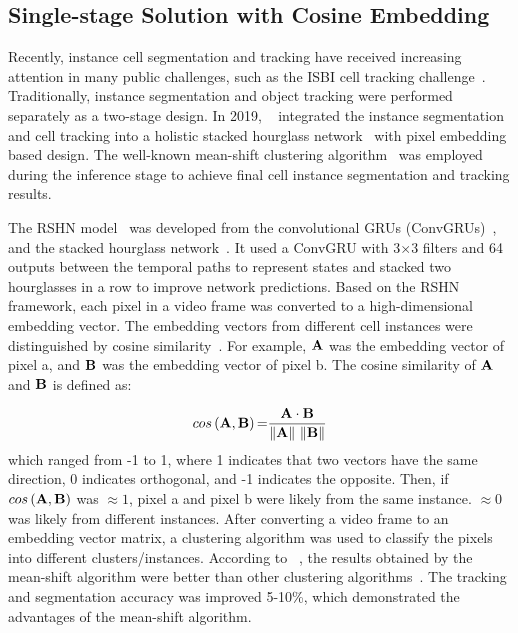 \documentclass[journal,twoside,web]{ieeecolor}
\begin{document}
\subsection{Single-stage Solution with Cosine Embedding}
Recently, instance cell segmentation and tracking have received increasing attention in many public challenges, such as the ISBI cell tracking challenge~\cite{b20}. Traditionally, instance segmentation and object tracking were performed separately as a two-stage design. In 2019, ~\cite{b15} integrated the instance segmentation and cell tracking into a holistic stacked hourglass network~\cite{b27} with pixel embedding based design. The well-known mean-shift clustering algorithm~\cite{b21} was employed during the inference stage to achieve final cell instance segmentation and tracking results.

The RSHN model~\cite{b15} was developed from the convolutional GRUs (ConvGRUs)~\cite{b26}, and the stacked hourglass network~\cite{b27}. It used a ConvGRU with 3$\times$3 filters and 64 outputs between the temporal paths to represent states and stacked two hourglasses in a row to improve network predictions. Based on the RSHN framework, each pixel in a video frame was converted to a high-dimensional embedding vector. The embedding vectors from different cell instances were distinguished by cosine similarity~\cite{b36}. For example, $\bf{A}$ was the embedding vector of pixel a, and $\bf{B}$ was the embedding vector of pixel b. The cosine similarity of $\bf{A}$ and $\bf{B}$ is defined as:

\begin{equation}
cos\left( {{\bf{A}},{\bf{B}}} \right){\rm{  = }}\frac{{{\bf{A}} \cdot {\bf{B}}}}{{\left\| {\bf{A}} \right\|{\rm{ }}\left\| {\bf{B}} \right\|}}
\label{eq1}\end{equation} which ranged from -1 to 1, where 1 indicates that two vectors have the same direction, 0 indicates orthogonal, and -1 indicates the opposite. Then, if $cos\left( {{\bf{A}},{\bf{B}}} \right)$ was $\approx1$, pixel a and pixel b were likely from the same instance. $\approx0$ was likely from different instances. After converting a video frame to an embedding vector matrix, a clustering algorithm was used to classify the pixels into different clusters/instances. According to ~\cite{b15}, the results obtained by the mean-shift algorithm were better than other clustering algorithms~\cite{b28}. The tracking and segmentation accuracy was improved 5-10\%, which demonstrated the advantages of the mean-shift algorithm.
\end{document}
